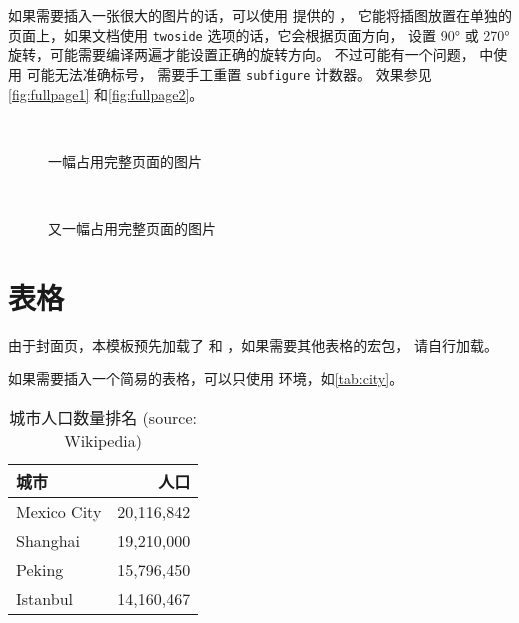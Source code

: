 如果需要插入一张很大的图片的话，可以使用  提供的 ，
它能将插图放置在单独的页面上，如果文档使用 \verb|twoside| 选项的话，它会根据页面方向，
设置 \ang{90} 或 \ang{270} 旋转，可能需要编译两遍才能设置正确的旋转方向。
不过可能有一个问题， 中使用  可能无法准确标号，
需要手工重置 \texttt{subfigure} 计数器。
效果参见\autoref{fig:fullpage1} 和\autoref{fig:fullpage2}。

\setcounter{subfigure}{0}
\begin{sidewaysfigure}
   \\
  \caption{一幅占用完整页面的图片}
  \label{fig:fullpage1}
\end{sidewaysfigure}

\setcounter{subfigure}{0}
\begin{sidewaysfigure}
   \\
  \caption{又一幅占用完整页面的图片}
  \label{fig:fullpage2}
\end{sidewaysfigure}

\section{表格}

由于封面页，本模板预先加载了  和 ，如果需要其他表格的宏包，
请自行加载。

如果需要插入一个简易的表格，可以只使用  环境，如\autoref{tab:city}。
\begin{table}[htb]
  \caption[城市人口]{城市人口数量排名 (source: Wikipedia)\label{tab:city}}
  \begin{tabular}{lr}
    \toprule
    城市 & 人口 \\
    \midrule
    Mexico City & 20,116,842\\
    Shanghai & 19,210,000\\
    Peking & 15,796,450\\
    Istanbul & 14,160,467\\
    \bottomrule
  \end{tabular}
\end{table}

